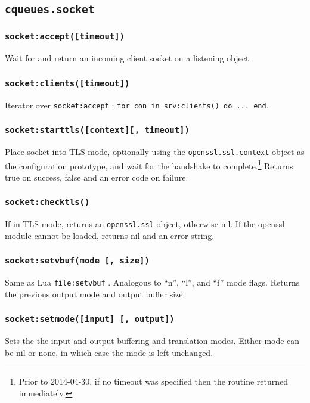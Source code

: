\documentclass[11pt, oneside]{memoir}
\newcommand{\fn}[1]{\texttt{#1} }
\newcommand{\method}[1]{\texttt{#1} }
\newcommand{\module}[1]{\texttt{#1} }
\newcounter{toccols}
\newenvironment{Module}[1]{
	\subsection{\texttt{#1}}
	\addtocontents{toc}{
		\protect\begin{multicols}{\value{toccols}}
	}
}{
	\addtocontents{toc}{\protect\end{multicols}}
}
\begin{document}
\begin{Module}{cqueues.socket}
\subsubsection[\fn{socket:accept}]{\fn{socket:accept([timeout])}}
Wait for and return an incoming client socket on a listening object.

\subsubsection[\fn{socket:clients}]{\fn{socket:clients([timeout])}}
Iterator over \method{socket:accept}: \texttt{for con in srv:clients() do ... end}.


\subsubsection[\fn{socket:starttls}]{\fn{socket:starttls([context][, timeout])}}
Place socket into TLS mode, optionally using the \module{openssl.ssl.context} object as the configuration prototype, and wait for the handshake to complete.\footnote{Prior to 2014-04-30, if no timeout was specified then the routine returned immediately.} Returns true on success, false and an error code on failure.

\subsubsection[\fn{socket:checktls}]{\fn{socket:checktls()}}

If in TLS mode, returns an \module{openssl.ssl} object, otherwise nil. If the openssl module cannot be loaded, returns nil and an error string.

\subsubsection[\fn{socket:setvbuf}]{\fn{socket:setvbuf(mode [, size])}}
Same as Lua \fn{file:setvbuf}. Analogous to ``n'', ``l'', and ``f'' mode flags. Returns the previous output mode and output buffer size.

\subsubsection[\fn{socket:setmode}]{\fn{socket:setmode([input] [, output])}}
Sets the the input and output buffering and translation modes. Either mode can be nil or none, in which case the mode is left unchanged.


\end{Module}
\end{document}
